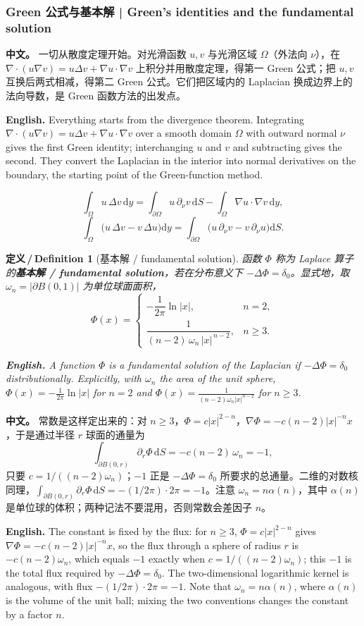 \documentclass[UTF8,11pt,a4paper]{ctexart}
\newcommand{\APS}[2]{\par\noindent\textbf{中文。} #1\par\noindent\textbf{English.} #2\par\smallskip}
\newcommand{\EN}[1]{\par\noindent \textbf{English.} #1\par}
\newtheorem{definition}{定义\,/\,Definition}[section]
\newcommand{\dd}{\mathrm{d}}
\begin{document}
\subsubsection{Green 公式与基本解 | Green's identities and the fundamental solution}
\APS{一切从散度定理开始。对光滑函数 $u,v$ 与光滑区域 $\Omega$（外法向 $\nu$），在 $\nabla\cdot(u\nabla v)=u\Delta v+\nabla u\cdot\nabla v$ 上积分并用散度定理，得第一 Green 公式；把 $u,v$ 互换后两式相减，得第二 Green 公式。它们把区域内的 Laplacian 换成边界上的法向导数，是 Green 函数方法的出发点。}{Everything starts from the divergence theorem. Integrating $\nabla\cdot(u\nabla v)=u\Delta v+\nabla u\cdot\nabla v$ over a smooth domain $\Omega$ with outward normal $\nu$ gives the first Green identity; interchanging $u$ and $v$ and subtracting gives the second. They convert the Laplacian in the interior into normal derivatives on the boundary, the starting point of the Green-function method.}

\[
\int_\Omega u\,\Delta v\,\dd y=\int_{\partial\Omega}u\,\partial_\nu v\,\dd S-\int_\Omega\nabla u\cdot\nabla v\,\dd y,
\]
\[
\int_\Omega\bigl(u\,\Delta v-v\,\Delta u\bigr)\dd y=\int_{\partial\Omega}\bigl(u\,\partial_\nu v-v\,\partial_\nu u\bigr)\dd S .
\]

\begin{definition}[基本解 / fundamental solution]\label{def:fundsol}
函数 $\Phi$ 称为 Laplace 算子的\textbf{基本解 / fundamental solution}，若在分布意义下 $-\Delta\Phi=\delta_0$。显式地，取 $\omega_n=|\partial B(0,1)|$ 为单位球面面积，
\[
\Phi(x)=\begin{cases}
-\dfrac{1}{2\pi}\ln|x|, & n=2,\\[6pt]
\dfrac{1}{(n-2)\,\omega_n\,|x|^{\,n-2}}, & n\ge 3 .
\end{cases}
\]
\EN{A function $\Phi$ is a fundamental solution of the Laplacian if $-\Delta\Phi=\delta_0$ distributionally. Explicitly, with $\omega_n$ the area of the unit sphere, $\Phi(x)=-\frac{1}{2\pi}\ln|x|$ for $n=2$ and $\Phi(x)=\frac{1}{(n-2)\omega_n|x|^{n-2}}$ for $n\ge3$.}
\end{definition}

\APS{常数是这样定出来的：对 $n\ge3$，$\Phi=c|x|^{2-n}$，$\nabla\Phi=-c(n-2)|x|^{-n}x$，于是通过半径 $r$ 球面的通量为
\[
\int_{\partial B(0,r)}\partial_r\Phi\,\dd S=-c(n-2)\,\omega_n=-1,
\]
只要 $c=1/((n-2)\omega_n)$；$-1$ 正是 $-\Delta\Phi=\delta_0$ 所要求的总通量。二维的对数核同理，$\int_{\partial B(0,r)}\partial_r\Phi\,\dd S=-(1/2\pi)\cdot2\pi=-1$。注意 $\omega_n=n\alpha(n)$，其中 $\alpha(n)$ 是单位球的体积；两种记法不要混用，否则常数会差因子 $n$。}{The constant is fixed by the flux: for $n\ge3$, $\Phi=c|x|^{2-n}$ gives $\nabla\Phi=-c(n-2)|x|^{-n}x$, so the flux through a sphere of radius $r$ is $-c(n-2)\omega_n$, which equals $-1$ exactly when $c=1/((n-2)\omega_n)$; this $-1$ is the total flux required by $-\Delta\Phi=\delta_0$. The two-dimensional logarithmic kernel is analogous, with flux $-(1/2\pi)\cdot2\pi=-1$. Note that $\omega_n=n\alpha(n)$, where $\alpha(n)$ is the volume of the unit ball; mixing the two conventions changes the constant by a factor $n$.}
\end{document}
